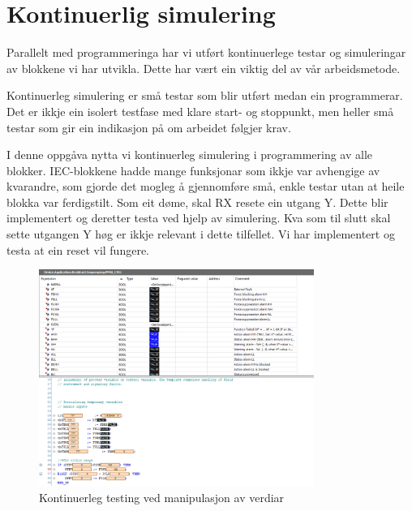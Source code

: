 \section{Kontinuerlig simulering}
\thispagestyle{fancy}

Parallelt med programmeringa har vi utført kontinuerlege testar og simuleringar av blokkene vi har utvikla. 
Dette har vært ein viktig del av vår arbeidsmetode. 

Kontinuerleg simulering er små testar som blir utført medan ein programmerar.
Det er ikkje ein isolert testfase med klare start- og stoppunkt, men heller små testar som gir ein indikasjon
på om arbeidet følgjer krav.

I denne oppgåva nytta vi kontinuerleg simulering i programmering av alle blokker.
\gls{IEC}-blokkene hadde mange funksjonar som ikkje var avhengige av kvarandre,
som gjorde det mogleg å gjennomføre små, enkle testar utan at heile blokka var ferdigstilt.\newline
Som eit døme, skal RX resete ein utgang Y. Dette blir implementert og deretter testa ved hjelp av simulering.
Kva som til slutt skal sette utgangen Y høg er ikkje relevant i dette tilfellet. Vi har implementert 
og testa at ein reset vil fungere.


\begin{figure}[htbp]
    \centering
    \includegraphics[width=0.8\textwidth]{Bilder/kontinuerligSimulering.png}
    \caption{Kontinuerleg testing ved manipulasjon av verdiar}\label{fig:KontinuerlegSimulering}
\end{figure}


\newpage
